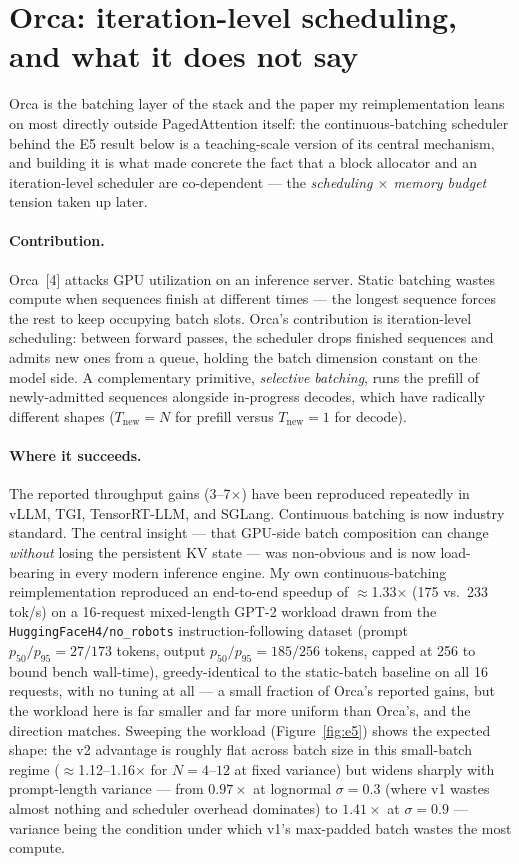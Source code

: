 \documentclass{article}
\begin{document}
\section{Orca: iteration-level scheduling, and what it does not say}

Orca is the batching layer of the stack and the paper my reimplementation leans on most directly outside PagedAttention itself: the continuous-batching scheduler behind the E5 result below is a teaching-scale version of its central mechanism, and building it is what made concrete the fact that a block allocator and an iteration-level scheduler are co-dependent --- the \emph{scheduling $\times$ memory budget} tension taken up later.

\paragraph{Contribution.} Orca~[4] attacks GPU utilization on an inference server. Static batching wastes compute when sequences finish at different times --- the longest sequence forces the rest to keep occupying batch slots. Orca's contribution is iteration-level scheduling: between forward passes, the scheduler drops finished sequences and admits new ones from a queue, holding the batch dimension constant on the model side. A complementary primitive, \emph{selective batching}, runs the prefill of newly-admitted sequences alongside in-progress decodes, which have radically different shapes ($T_\text{new}{=}N$ for prefill versus $T_\text{new}{=}1$ for decode).

\paragraph{Where it succeeds.} The reported throughput gains (3--7$\times$) have been reproduced repeatedly in vLLM, TGI, TensorRT-LLM, and SGLang. Continuous batching is now industry standard. The central insight --- that GPU-side batch composition can change \emph{without} losing the persistent KV state --- was non-obvious and is now load-bearing in every modern inference engine. My own continuous-batching reimplementation reproduced an end-to-end speedup of $\approx$1.33$\times$ (175 vs.\ 233 tok/s) on a 16-request mixed-length GPT-2 workload drawn from the \texttt{HuggingFaceH4/no\_robots} instruction-following dataset (prompt $p_{50}/p_{95}{=}27/173$ tokens, output $p_{50}/p_{95}{=}185/256$ tokens, capped at 256 to bound bench wall-time), greedy-identical to the static-batch baseline on all 16 requests, with no tuning at all --- a small fraction of Orca's reported gains, but the workload here is far smaller and far more uniform than Orca's, and the direction matches. Sweeping the workload (Figure~\ref{fig:e5}) shows the expected shape: the v2 advantage is roughly flat across batch size in this small-batch regime ($\approx$1.12--1.16$\times$ for $N{=}4$--$12$ at fixed variance) but widens sharply with prompt-length variance --- from $0.97\times$ at lognormal $\sigma{=}0.3$ (where v1 wastes almost nothing and scheduler overhead dominates) to $1.41\times$ at $\sigma{=}0.9$ --- variance being the condition under which v1's max-padded batch wastes the most compute.
\end{document}
